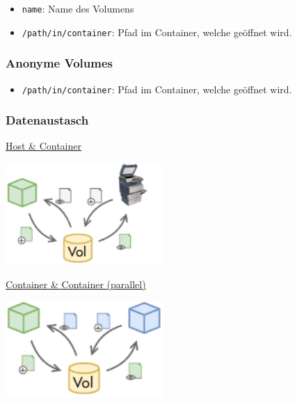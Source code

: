 \documentclass[
  10pt,
  a4paper,
  twocolumn]{article}
\newenvironment{Shaded}{}{}
\newcommand{\AttributeTok}[1]{\textcolor[rgb]{0.84,0.23,0.29}{#1}}
\newcommand{\ExtensionTok}[1]{\textcolor[rgb]{0.84,0.23,0.29}{\textbf{#1}}}
\newcommand{\NormalTok}[1]{\textcolor[rgb]{0.14,0.16,0.18}{#1}}
\newcommand{\OperatorTok}[1]{\textcolor[rgb]{0.14,0.16,0.18}{#1}}
\providecommand{\tightlist}{%
  \setlength{\itemsep}{0pt}\setlength{\parskip}{0pt}}\usepackage{longtable,booktabs,array}
\newcommand*\circled[1]{\tikz[baseline=(char.base)]{
          \node[shape=circle,draw,inner sep=1pt] (char) {{\scriptsize#1}};}}
\begin{document}
\begin{itemize}
\tightlist
\item
  \texttt{name}: Name des Volumens
\item
  \texttt{/path/in/container}: Pfad im Container, welche geöffnet wird.
\end{itemize}

\subsubsection{Anonyme Volumes}\label{anonyme-volumes}

\begin{Shaded}
\end{Shaded}

\begin{itemize}
\tightlist
\item
  \texttt{/path/in/container}: Pfad im Container, welche geöffnet wird.
\end{itemize}

\subsubsection{Datenaustasch}\label{datenaustasch}

\circled{1} \ul{Host \& Container}

\begin{center}
\includegraphics[width=6cm,height=\textheight]{images/docker/volume_exchange_host.pdf}
\end{center}

\circled{2} \ul{Container \& Container (parallel)}

\begin{center}
\includegraphics[width=6cm,height=\textheight]{images/docker/volume_exchange_parallel.pdf}
\end{center}
\end{document}
